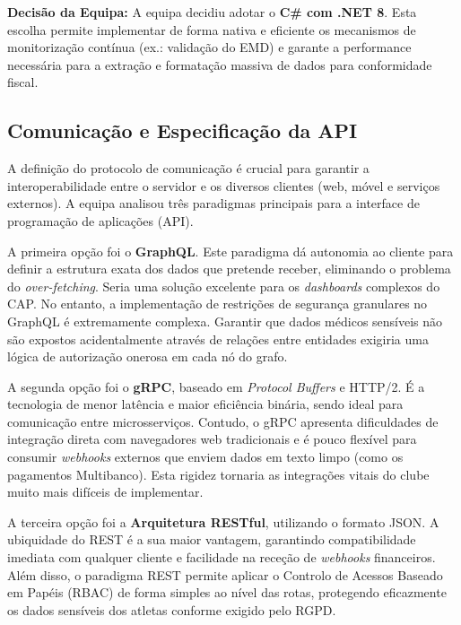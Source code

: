\documentclass[a4paper,12pt]{scrreprt}
\begin{document}
{\textbf{Decisão da Equipa:} A equipa decidiu adotar o \textbf{C\# com .NET 8}. Esta escolha permite implementar de forma nativa e eficiente os mecanismos de monitorização contínua (ex.: validação do EMD) e garante a performance necessária para a extração e formatação massiva de dados para conformidade fiscal.



\subsection{Comunicação e Especificação da API}

A definição do protocolo de comunicação é crucial para garantir a interoperabilidade entre o servidor e os diversos clientes (web, móvel e serviços externos). A equipa analisou três paradigmas principais para a interface de programação de aplicações (API).

A primeira opção foi o \textbf{GraphQL}. Este paradigma dá autonomia ao cliente para definir a estrutura exata dos dados que pretende receber, eliminando o problema do \textit{over-fetching}. Seria uma solução excelente para os \textit{dashboards} complexos do CAP. No entanto, a implementação de restrições de segurança granulares no GraphQL é extremamente complexa. Garantir que dados médicos sensíveis não são expostos acidentalmente através de relações entre entidades exigiria uma lógica de autorização onerosa em cada nó do grafo.

A segunda opção foi o \textbf{gRPC}, baseado em \textit{Protocol Buffers} e HTTP/2. É a tecnologia de menor latência e maior eficiência binária, sendo ideal para comunicação entre microsserviços. Contudo, o gRPC apresenta dificuldades de integração direta com navegadores web tradicionais e é pouco flexível para consumir \textit{webhooks} externos que enviem dados em texto limpo (como os pagamentos Multibanco). Esta rigidez tornaria as integrações vitais do clube muito mais difíceis de implementar.

A terceira opção foi a \textbf{Arquitetura RESTful}, utilizando o formato JSON. A ubiquidade do REST é a sua maior vantagem, garantindo compatibilidade imediata com qualquer cliente e facilidade na receção de \textit{webhooks} financeiros. Além disso, o paradigma REST permite aplicar o Controlo de Acessos Baseado em Papéis (RBAC) de forma simples ao nível das rotas, protegendo eficazmente os dados sensíveis dos atletas conforme exigido pelo RGPD.

}
\end{document}
